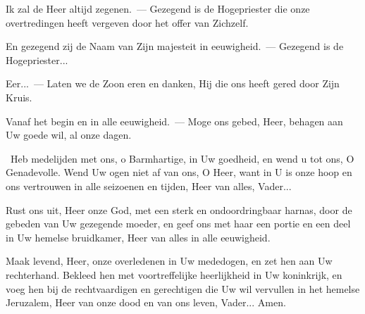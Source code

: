 \documentclass[12pt,twoside,a5paper]{article}
\begin{document}
\begin{halfparskip}
   Ik zal de Heer altijd zegenen.~--- Gezegend is de Hogepriester die onze overtredingen heeft vergeven door het offer van Zichzelf.

  En gezegend zij de Naam van Zijn majesteit in eeuwigheid.~--- Gezegend is de Hogepriester...

  Eer...~--- Laten we de Zoon eren en danken, Hij die ons heeft gered door Zijn Kruis.

  Vanaf het begin en in alle eeuwigheid.~--- Moge ons gebed, Heer, behagen aan Uw goede wil, al onze dagen.
\end{halfparskip}

\begin{halfparskip}
   \cc~Heb medelijden met ons, o Barmhartige, in Uw goedheid, en wend u tot ons, O Genadevolle. Wend Uw ogen niet af van ons, O Heer, want in U is onze hoop en ons vertrouwen in alle seizoenen en tijden, Heer van alles, Vader...
\end{halfparskip}

\begin{halfparskip}
   Rust ons uit, Heer onze God, met een sterk en ondoordringbaar harnas, door de gebeden van Uw gezegende moeder, en geef ons met haar een portie en een deel in Uw hemelse bruidkamer, Heer van alles in alle eeuwigheid.
\end{halfparskip}

\begin{halfparskip}
   Maak levend, Heer, onze overledenen in Uw mededogen, en zet hen aan Uw rechterhand. Bekleed hen met voortreffelijke heerlijkheid in Uw koninkrijk, en voeg hen bij de rechtvaardigen en gerechtigen die Uw wil vervullen in het hemelse Jeruzalem, Heer van onze dood en van ons leven, Vader... Amen.
\end{halfparskip}


\end{document}
